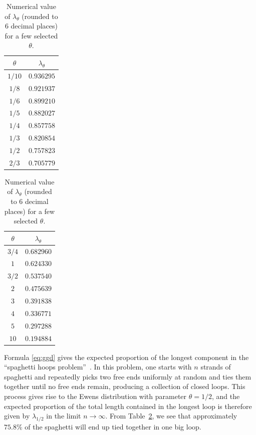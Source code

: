 \documentclass{amsart}
\theoremstyle{definition}
\theoremstyle{remark}
\numberwithin{equation}{section}
\begin{document}
\begin{table}[ht]
\caption{Numerical value of $\lambda_{\theta}$ (rounded to $6$ decimal places) for a few selected $\theta$.}
\label{tab:ggd}
\centering
\begin{minipage}{0.30\textwidth}
\centering
    \begin{tabular}{cc}
    \hline \hline
    $\theta$ & $\lambda_{\theta}$ \\ 
    \hline
    $1/10$   & $0.936295$ \\
    $1/8$    & $0.921937$ \\
    $1/6$    & $0.899210$ \\
    $1/5$    & $0.882027$ \\
    $1/4$    & $0.857758$ \\
    $1/3$    & $0.820854$ \\
    $1/2$    & $0.757823$ \\ 
    $2/3$    & $0.705779$ \\
    \hline \hline
    \end{tabular}
\end{minipage}
\begin{minipage}{0.30\textwidth}
\centering
    \begin{tabular}{cc}
    \hline \hline
    $\theta$ & $\lambda_{\theta}$ \\ 
    \hline
    $3/4$    & $0.682960$ \\
    $1$      & $0.624330$ \\
    $3/2$    & $0.537540$ \\
    $2$      & $0.475639$ \\
    $3$      & $0.391838$ \\
    $4$      & $0.336771$ \\
    $5$      & $0.297288$ \\ 
    $10$     & $0.194884$ \\ 
    \hline \hline
    \end{tabular}
\end{minipage}
\end{table}

Formula \eqref{eq:ggd} gives the expected proportion of the longest component in the ``spaghetti hoops problem''~\cite{Tavare2021}. In this problem, one starts with $n$ strands of spaghetti and repeatedly picks two free ends uniformly at random and ties them together until no free ends remain, producing a collection of closed loops. This process gives rise to the Ewens distribution with parameter $\theta = 1/2$, and the expected proportion of the total length contained in the longest loop is therefore given by $\lambda_{1/2}$ in the limit $n \to \infty$. From Table~\ref{tab:ggd}, we see that approximately $75.8\%$ of the spaghetti will end up tied together in one big loop. 
\end{document}
